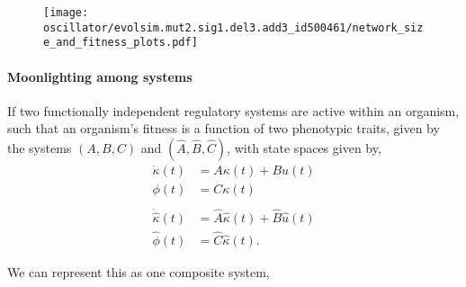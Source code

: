\documentclass{article}
\newcommand{\1}{\mathbbm{1}}
\begin{document}
\begin{figure}[H]
\texttt{[image: oscillator/evolsim.mut2.sig1.del3.add3\_id500461/network\_size\_and\_fitness\_plots.pdf]}
\end{figure}

\paragraph{Moonlighting among systems}

If two functionally independent regulatory systems are active within an organism, such that an organism's
fitness is a function of two phenotypic traits, given by the systems $\left(A,B,C\right)$
and $(\widehat{A}, \widehat{B}, \widehat{C})$, with state spaces given by, 
\begin{equation}
   \begin{aligned}
    \dot{\kappa}(t) &= A \kappa(t) + B u(t) \\
    \phi(t) &= C \kappa(t) \\ \\
     \dot{\hat{\kappa}}(t) &= \widehat{A} \hat{\kappa}(t) + \widehat{B} \hat{u}(t) \\
     \hat{\phi}(t) &= \widehat{C} \hat{\kappa}(t) .
  \end{aligned} 
\end{equation}

We can represent this as one composite system, 
\end{document}
